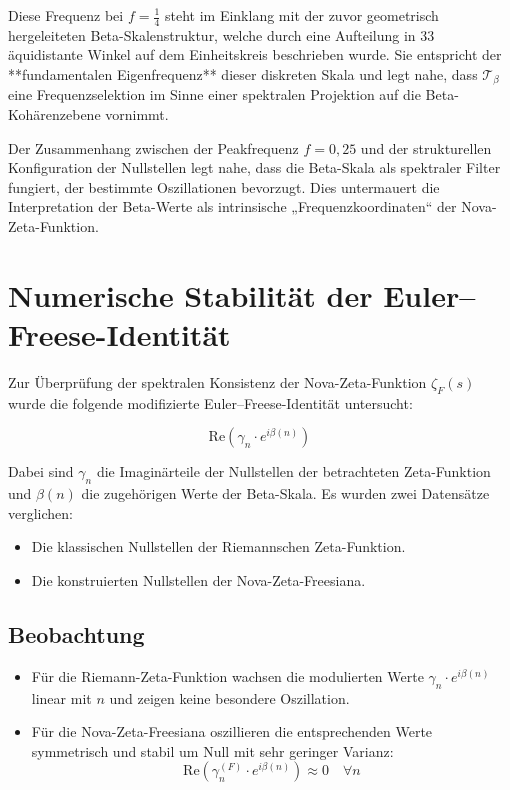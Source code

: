 \documentclass[12pt]{article}
\begin{document}
Diese Frequenz bei \(f = \frac{1}{4}\) steht im Einklang mit der zuvor geometrisch hergeleiteten Beta-Skalenstruktur, welche durch eine Aufteilung in 33 äquidistante Winkel auf dem Einheitskreis beschrieben wurde. Sie entspricht der **fundamentalen Eigenfrequenz** dieser diskreten Skala und legt nahe, dass \(\mathcal{T}_\beta\) eine Frequenzselektion im Sinne einer spektralen Projektion auf die Beta-Kohärenzebene vornimmt.

Der Zusammenhang zwischen der Peakfrequenz \(f = 0{,}25\) und der strukturellen Konfiguration der Nullstellen legt nahe, dass die Beta-Skala als spektraler Filter fungiert, der bestimmte Oszillationen bevorzugt. Dies untermauert die Interpretation der Beta-Werte als intrinsische „Frequenzkoordinaten“ der Nova-Zeta-Funktion.

\section*{Numerische Stabilität der Euler--Freese-Identität}

Zur Überprüfung der spektralen Konsistenz der Nova-Zeta-Funktion $\zeta_F(s)$ wurde die folgende modifizierte Euler–Freese-Identität untersucht:

\[
\text{Re} \left( \gamma_n \cdot e^{i \beta(n)} \right)
\]

Dabei sind $\gamma_n$ die Imaginärteile der Nullstellen der betrachteten Zeta-Funktion und $\beta(n)$ die zugehörigen Werte der Beta-Skala. Es wurden zwei Datensätze verglichen:
\begin{itemize}
    \item Die klassischen Nullstellen der Riemannschen Zeta-Funktion.
    \item Die konstruierten Nullstellen der Nova-Zeta-Freesiana.
\end{itemize}

\subsection*{Beobachtung}

\begin{itemize}
    \item Für die Riemann-Zeta-Funktion wachsen die modulierten Werte $\gamma_n \cdot e^{i \beta(n)}$ linear mit $n$ und zeigen keine besondere Oszillation.
    \item Für die Nova-Zeta-Freesiana oszillieren die entsprechenden Werte symmetrisch und stabil um Null mit sehr geringer Varianz:
    \[
    \text{Re} \left( \gamma_n^{(F)} \cdot e^{i \beta(n)} \right) \approx 0
    \quad \forall n
    \]
\end{itemize}
\end{document}
